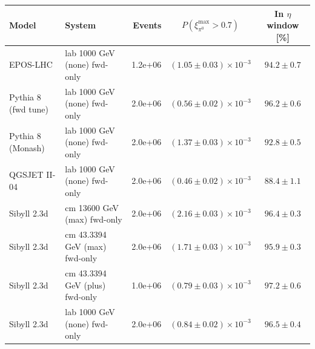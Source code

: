 \begin{tabular}{llrcc}
\hline
Model & System & Events & $P(\xi_{\pi^0}^{\max}>0.7)$ & In $\eta$ window [\%] \\
\hline
EPOS-LHC & lab 1000 GeV (none) fwd-only & 1.2e+06 & $(1.05\pm0.03)\times10^{-3}$ & $94.2\pm0.7$ \\
Pythia 8 (fwd tune) & lab 1000 GeV (none) fwd-only & 2.0e+06 & $(0.56\pm0.02)\times10^{-3}$ & $96.2\pm0.6$ \\
Pythia 8 (Monash) & lab 1000 GeV (none) fwd-only & 2.0e+06 & $(1.37\pm0.03)\times10^{-3}$ & $92.8\pm0.5$ \\
QGSJET II-04 & lab 1000 GeV (none) fwd-only & 2.0e+06 & $(0.46\pm0.02)\times10^{-3}$ & $88.4\pm1.1$ \\
Sibyll 2.3d & cm 13600 GeV (max) fwd-only & 2.0e+06 & $(2.16\pm0.03)\times10^{-3}$ & $96.4\pm0.3$ \\
Sibyll 2.3d & cm 43.3394 GeV (max) fwd-only & 2.0e+06 & $(1.71\pm0.03)\times10^{-3}$ & $95.9\pm0.3$ \\
Sibyll 2.3d & cm 43.3394 GeV (plus) fwd-only & 1.0e+06 & $(0.79\pm0.03)\times10^{-3}$ & $97.2\pm0.6$ \\
Sibyll 2.3d & lab 1000 GeV (none) fwd-only & 2.0e+06 & $(0.84\pm0.02)\times10^{-3}$ & $96.5\pm0.4$ \\
\hline
\end{tabular}
